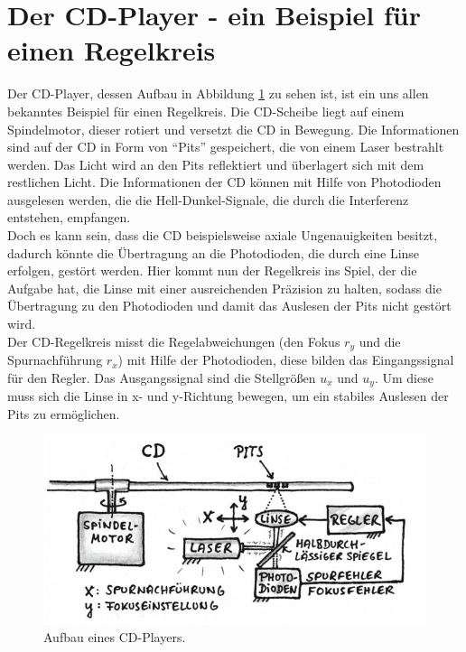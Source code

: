 \section{Der CD-Player - ein Beispiel für einen Regelkreis}
Der CD-Player, dessen Aufbau in Abbildung \ref{fig:Bild2} zu sehen ist, ist ein uns allen bekanntes Beispiel für einen Regelkreis. Die CD-Scheibe liegt auf einem Spindelmotor, dieser rotiert und versetzt die CD in Bewegung. Die Informationen sind auf der CD in Form von "`Pits"' gespeichert, die von einem Laser bestrahlt werden. Das Licht wird an den Pits reflektiert und überlagert sich mit dem restlichen Licht. Die Informationen der CD können mit Hilfe von Photodioden ausgelesen werden, die die Hell-Dunkel-Signale, die durch die Interferenz entstehen, empfangen. 
\\Doch es kann sein, dass die CD beispielsweise axiale Ungenauigkeiten besitzt, dadurch könnte die Übertragung an die Photodioden, die durch eine Linse erfolgen, gestört werden. Hier kommt nun der Regelkreis ins Spiel, der die Aufgabe hat, die Linse mit einer ausreichenden Präzision zu halten, sodass die Übertragung zu den Photodioden und damit das Auslesen der Pits nicht gestört wird.\\
Der CD-Regelkreis misst die Regelabweichungen (den Fokus $r_y$ und die Spurnachführung $r_x$) mit Hilfe der Photodioden, diese bilden das Eingangssignal für den Regler. Das Ausgangssignal sind die Stellgrößen $u_x$ und $u_y$. Um diese muss sich die Linse in x- und y-Richtung bewegen, um ein stabiles Auslesen der Pits zu ermöglichen. 
\begin{figure}[H]
\centering 
\includegraphics[width=1.05\textwidth]{images/Bild2} 
\vspace{0.2cm}
\caption{Aufbau eines CD-Players.}
\label{fig:Bild2}
\end{figure} 

